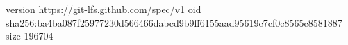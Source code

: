 version https://git-lfs.github.com/spec/v1
oid sha256:ba4ba087f25977230d566466dabcd9b9ff6155aad95619c7cf0c8565c8581887
size 196704
